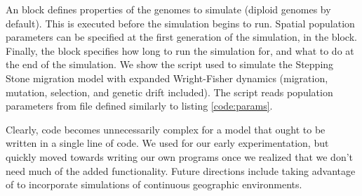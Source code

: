 

An  block defines properties of the genomes to simulate (diploid genomes by default). This is executed before the simulation begins to run. Spatial population parameters can be specified at the first generation of the simulation, in the  block. Finally, the  block specifies how long to run the simulation for, and what to do at the end of the simulation. We show the script used to simulate the Stepping Stone migration model with expanded Wright-Fisher dynamics (migration, mutation, selection, and genetic drift included). The script reads population parameters from  file defined similarly to listing \ref{code:params}. 




Clearly,  code becomes unnecessarily complex for a model that ought to be written in a single line of code. We used  for our early experimentation, but quickly moved towards writing our own programs once we realized that we don't need much of the added  functionality. Future directions include taking advantage of  to incorporate simulations of continuous geographic environments.
